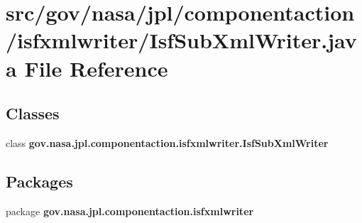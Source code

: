 \section{src/gov/nasa/jpl/componentaction/isfxmlwriter/\+Isf\+Sub\+Xml\+Writer.java File Reference}
\label{_isf_sub_xml_writer_8java}
\subsection*{Classes}
\begin{DoxyCompactItemize}
\item 
class {\bf gov.\+nasa.\+jpl.\+componentaction.\+isfxmlwriter.\+Isf\+Sub\+Xml\+Writer}
\end{DoxyCompactItemize}
\subsection*{Packages}
\begin{DoxyCompactItemize}
\item 
package {\bf gov.\+nasa.\+jpl.\+componentaction.\+isfxmlwriter}
\end{DoxyCompactItemize}
